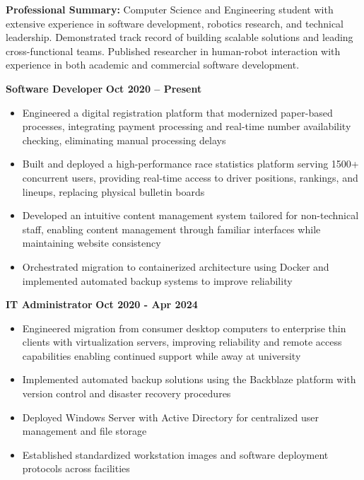 \documentclass{article}
\begin{document}


\noindent
\begin{minipage}{\textwidth}
    \textbf{Professional Summary:} Computer Science and Engineering student with extensive experience in software development, robotics research, and technical leadership. 
    Demonstrated track record of building scalable solutions and leading cross-functional teams. 
    Published researcher in human-robot interaction with experience in both academic and commercial software development.
\end{minipage}




 \hfill {}

\textbf{Software Developer} \hfill \textbf{Oct 2020 – Present}
\begin{itemize}[noitemsep,topsep=2pt]
	\item Engineered a digital registration platform that modernized paper-based processes, integrating payment processing and real-time number availability checking, eliminating manual processing delays
	\item Built and deployed a high-performance race statistics platform serving 1500+ concurrent users, providing real-time access to driver positions, rankings, and lineups, replacing physical bulletin boards
	\item Developed an intuitive content management system tailored for non-technical staff, enabling content management through familiar interfaces while maintaining website consistency
	\item Orchestrated migration to containerized architecture using Docker and implemented automated backup systems to improve reliability
\end{itemize}

\textbf{IT Administrator} \hfill \textbf{Oct 2020 - Apr 2024}
\begin{itemize}[noitemsep,topsep=2pt]
	\item Engineered migration from consumer desktop computers to enterprise thin clients with virtualization servers, improving reliability and remote access capabilities enabling continued support while away at university
	\item Implemented automated backup solutions using the Backblaze platform with version control and disaster recovery procedures
	\item Deployed Windows Server with Active Directory for centralized user management and file storage
	\item Established standardized workstation images and software deployment protocols across facilities
\end{itemize}
\end{document}
